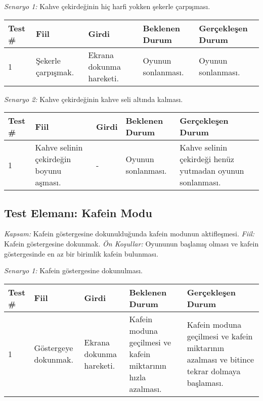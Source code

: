 \documentclass[12pt,a4paper]{article}
\begin{document}
   \textit{Senaryo 1:} Kahve çekirdeğinin hiç harfi yokken şekerle çarpışması.

   \begin{center}
      \begin{tabular}{ | l | p{3cm} | p{3cm} | p{3cm} | p{5cm} | }
      \hline
      Test \# & Fiil & Girdi & Beklenen Durum & Gerçekleşen Durum \\ \hline
      1 & Şekerle çarpışmak. & Ekrana dokunma hareketi. & Oyunun sonlanması. & Oyunun sonlanması. \\ \hline
      \end{tabular}
   \end{center}

   \textit{Senaryo 2:} Kahve çekirdeğinin kahve seli altında kalması.

   \begin{center}
      \begin{tabular}{ | l | p{3cm} | p{3cm} | p{3cm} | p{5cm} | }
      \hline
      Test \# & Fiil & Girdi & Beklenen Durum & Gerçekleşen Durum \\ \hline
      1 & Kahve selinin çekirdeğin boyunu aşması. & - & Oyunun sonlanması. & Kahve selinin çekirdeği henüz yutmadan oyunun sonlanması. \\ \hline
      \end{tabular}
   \end{center}

   \subsection{Test Elemanı: Kafein Modu}
   \textit{Kapsam:} Kafein göstergesine dokunulduğunda kafein modunun aktifleşmesi. \newline
   \textit{Fiil:} Kafein göstergesine dokunmak. \newline
   \textit{Ön Koşullar:} Oyununun başlamış olması ve kafein göstergesinde en az bir birimlik kafein bulunması. \newline

   \textit{Senaryo 1:} Kafein göstergesine dokunulması.

   \begin{center}
      \begin{tabular}{ | l | p{3cm} | p{3cm} | p{3cm} | p{5cm} | }
      \hline
      Test \# & Fiil & Girdi & Beklenen Durum & Gerçekleşen Durum \\ \hline
      1 & Göstergeye dokunmak. & Ekrana dokunma hareketi. & Kafein moduna geçilmesi ve kafein miktarının hızla azalması. & Kafein moduna geçilmesi ve kafein miktarının azalması ve bitince tekrar dolmaya başlaması. \\ \hline
      \end{tabular}
   \end{center}
\end{document}
